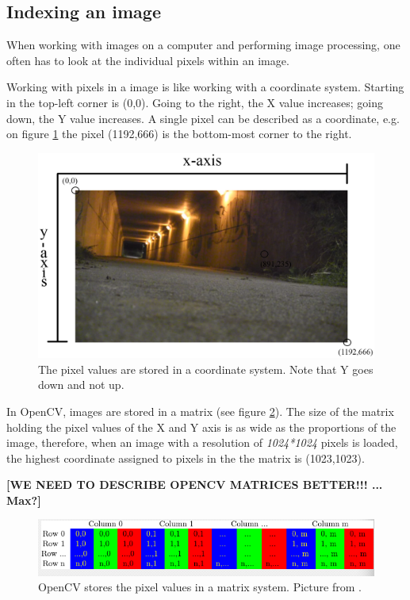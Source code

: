 \subsection{Indexing an image}
When working with images on a computer and performing image processing, one often has to look at the individual pixels within an image.

Working with pixels in a image is like working with a coordinate system. Starting in the top-left corner is (0,0). Going to the right, the X value increases; going down, the Y value increases. A single pixel can be described as a coordinate, e.g. on figure \ref{fig:ip_IndexingAPicture} the pixel (1192,666) is the bottom-most corner to the right.

\begin{figure}[htbp]
\centering
\includegraphics[width=1.00\textwidth]{Pictures/Theory/IndexingAPicture}
\caption{The pixel values are stored in a coordinate system. Note that Y goes down and not up.}
\label{fig:ip_IndexingAPicture}
\end{figure} 

In OpenCV, images are stored in a matrix (see figure \ref{fig:opencv_matrix}). The size of the matrix holding the pixel values of the X and Y axis is as wide as the proportions of the image, therefore, when an image with a resolution of \textit{1024*1024} pixels is loaded, the highest coordinate assigned to pixels in the the matrix is (1023,1023).

\textbf{[WE NEED TO DESCRIBE OPENCV MATRICES BETTER!!! ... Max?]}

\begin{figure}[htbp]
\centering
\includegraphics[width=1.00\textwidth]{Pictures/Theory/opencv_matrix}
\caption{OpenCV stores the pixel values in a matrix system. Picture from \citep{opencv}.}
\label{fig:opencv_matrix}
\end{figure} 

